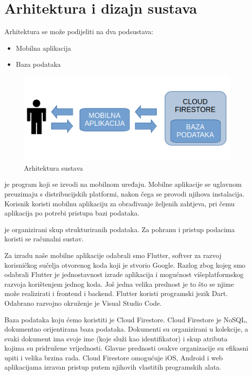 \chapter{Arhitektura i dizajn sustava}
		
		Arhitektura se može podijeliti na dva podsustava:
	\begin{itemize}
		\item Mobilna aplikacija
		\item Baza podataka
	\end{itemize}
	
	\begin{figure}[h]
		\includegraphics[scale=0.55]{slike/Arhitektura_sustava.PNG}
		\centering
		\caption{Arhitektura sustava}
		\label{fig:Arhitektura_sustava}
	\end{figure}
	
		\textit{} je program koji se izvodi na mobilnom uređaju. Mobilne aplikacije se uglavnom preuzimaju s distribucijskih platformi, nakon čega se provodi njihova instalacija. Korisnik koristi mobilnu aplikaciju za obrađivanje željenih zahtjeva, pri čemu aplikacija po potrebi pristupa bazi podataka.
		
		\textit{} je organizirani skup strukturiranih podataka. Za pohranu i pristup podacima koristi se računalni sustav.
		
		Za izradu naše mobilne aplikacije odabrali smo Flutter, softver za razvoj korisničkog sučelja otvorenog koda koji je stvorio Google. Razlog zbog kojeg smo odabrali Flutter je jednostavnost izrade aplikacija i mogućnost višeplatformskog razvoja korištenjem jednog koda. Još jedna velika prednost je to što se njime može realizirati i frontend i backend. Flutter koristi programski jezik Dart. Odabrano razvojno okruženje je Visual Studio Code.
		
		Baza podataka koju ćemo koristiti je Cloud Firestore. Cloud Firestore je NoSQL, dokumentno orijentirana baza podataka. Dokumenti su organizirani u kolekcije, a svaki dokument ima svoje ime (koje služi kao identifikator) i skup atributa kojima su pridružene vrijednosti. Glavne prednosti ovakve organizacije su efikasni upiti i velika brzina rada. Cloud Firestore omogućuje iOS, Android i web aplikacijama izravan pristup putem njihovih vlastitih programskih alata.
		
